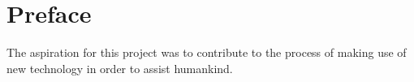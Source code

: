 \chapter*{Preface}

The aspiration for this project was to contribute to the process of making use of new technology in order to assist humankind. 